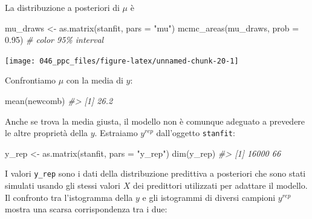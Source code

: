 \documentclass[
  10pt,
  italian,
  a4paper,
  extrafontsizes,onecolumn,openright
  ]{memoir}
\newenvironment{Shaded}{\begin{snugshade}}{\end{snugshade}}
\newcommand{\AttributeTok}[1]{\textcolor[rgb]{0.77,0.63,0.00}{#1}}
\newcommand{\CommentTok}[1]{\textcolor[rgb]{0.56,0.35,0.01}{\textit{#1}}}
\newcommand{\DecValTok}[1]{\textcolor[rgb]{0.00,0.00,0.81}{#1}}
\newcommand{\FloatTok}[1]{\textcolor[rgb]{0.00,0.00,0.81}{#1}}
\newcommand{\FunctionTok}[1]{\textcolor[rgb]{0.00,0.00,0.00}{#1}}
\newcommand{\NormalTok}[1]{#1}
\newcommand{\OtherTok}[1]{\textcolor[rgb]{0.56,0.35,0.01}{#1}}
\newcommand{\SpecialCharTok}[1]{\textcolor[rgb]{0.00,0.00,0.00}{#1}}
\newcommand{\StringTok}[1]{\textcolor[rgb]{0.31,0.60,0.02}{#1}}
\begin{document}
\noindent
La distribuzione a posteriori di \(\mu\) è

\begin{Shaded}
\begin{Highlighting}[]
\NormalTok{mu\_draws }\OtherTok{\textless{}{-}} \FunctionTok{as.matrix}\NormalTok{(stanfit, }\AttributeTok{pars =} \StringTok{"mu"}\NormalTok{)}
\FunctionTok{mcmc\_areas}\NormalTok{(mu\_draws, }\AttributeTok{prob =} \FloatTok{0.95}\NormalTok{) }\CommentTok{\# color 95\% interval}
\end{Highlighting}
\end{Shaded}

\begin{center}\texttt{[image: 046\_ppc\_files/figure-latex/unnamed-chunk-20-1]} \end{center}

\noindent
Confrontiamo \(\mu\) con la media di \(y\):

\begin{Shaded}
\begin{Highlighting}[]
\FunctionTok{mean}\NormalTok{(newcomb)}
\CommentTok{\#\textgreater{} [1] 26.2}
\end{Highlighting}
\end{Shaded}

\noindent
Anche se trova la media giusta, il modello non è comunque adeguato a prevedere le altre proprietà della \(y\). Estraiamo \(y^{rep}\) dall'oggetto \texttt{stanfit}:

\begin{Shaded}
\begin{Highlighting}[]
\NormalTok{y\_rep }\OtherTok{\textless{}{-}} \FunctionTok{as.matrix}\NormalTok{(stanfit, }\AttributeTok{pars =} \StringTok{"y\_rep"}\NormalTok{)}
\FunctionTok{dim}\NormalTok{(y\_rep)}
\CommentTok{\#\textgreater{} [1] 16000    66}
\end{Highlighting}
\end{Shaded}

\noindent
I valori \texttt{y\_rep} sono i dati della distribuzione predittiva a posteriori che sono stati simulati usando gli stessi valori \(X\) dei predittori utilizzati per adattare il modello. Il confronto tra l'istogramma della \(y\) e gli istogrammi di diversi campioni \(y^{rep}\) mostra una scarsa corrispondenza tra i due:

\begin{Shaded}
\end{Shaded}
\end{document}
